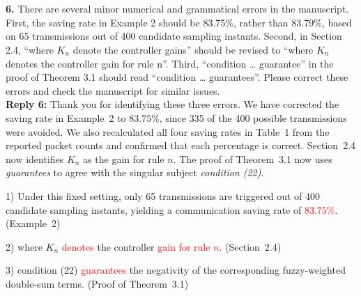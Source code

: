 \documentclass[10pt,fleqn]{article}
\begin{document}
%
%
%
%


~\\
\\
\textbf{6.} There are several minor numerical and grammatical errors in the manuscript. First, the saving rate in Example 2 should be 83.75\%, rather than 83.79\%, based on 65 transmissions out of 400 candidate sampling instants. Second, in Section 2.4, ``where $K_n$ denote the controller gains'' should be revised to ``where $K_n$ denotes the controller gain for rule n''. Third, ``condition \ldots{} guarantee'' in the proof of Theorem 3.1 should read ``condition \ldots{} guarantees''. Please correct these errors and check the manuscript for similar issues.
\\[10pt]
\begingroup
\setlength{\parskip}{6pt}
\indent \textbf{Reply 6:} Thank you for identifying these three errors. We have corrected the saving rate in Example~2 to $83.75\%$, since 335 of the 400 possible transmissions were avoided. We also recalculated all four saving rates in Table~1 from the reported packet counts and confirmed that each percentage is correct. Section~2.4 now identifies $K_n$ as the gain for rule $n$. The proof of Theorem~3.1 now uses \emph{guarantees} to agree with the singular subject \emph{condition (22)}.\par
1) Under this fixed setting, only 65 transmissions are triggered out of 400 candidate sampling instants, yielding a communication saving rate of \textcolor{red}{$83.75\%$}. (Example~2)\par
2) where $K_n$ \textcolor{red}{denotes} the controller \textcolor{red}{gain for rule $n$}. (Section~2.4)\par
3) condition (22) \textcolor{red}{guarantees} the negativity of the corresponding fuzzy-weighted double-sum terms. (Proof of Theorem~3.1)\par
\endgroup
\end{document}
